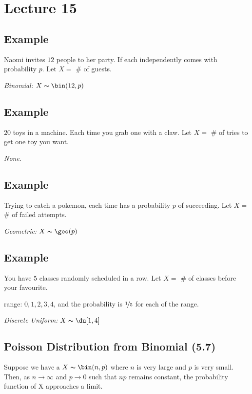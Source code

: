\section{Lecture 15}
\subsection{Example}
Naomi invites $ 12 $ people to her party. If each independently comes with
probability $ p $.
Let $ X= $ \# of guests.

\emph{Binomial:} $ X \thicksim \bin(12,p) $

\subsection{Example}
$ 20 $ toys in a machine. Each time you grab one with a claw. 
Let $ X= $ \# of tries to get one toy you want.

\emph{None.}

\subsection{Example}
Trying to catch a pokemon, each time has a probability $ p $ of succeeding.
Let $ X= $ \# of failed attempts.

\emph{Geometric:} $ X \thicksim \geo(p) $

\subsection{Example}
You have $ 5 $ classes randomly scheduled in a row.
Let $ X= $ \# of classes before your favourite.

range: $ 0,1,2,3,4 $, and the probability is $ \nicefrac{1}{5} $ for each
of the range.

\emph{Discrete Uniform:} $ X \thicksim \du[1,4] $

\subsection{Poisson Distribution from Binomial (5.7)}
Suppose we have a $ X \thicksim \bin(n,p) $ where $ n $ is very large
and $ p $ is very small. Then, as $ n\rightarrow \infty $ and $ p\rightarrow 0 $
such that $ np $ remains constant, the probability function of X
approaches a limit.

